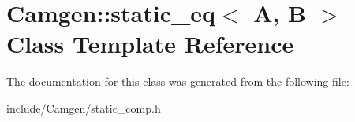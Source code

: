 \hypertarget{a00506}{\section{Camgen\-:\-:static\-\_\-eq$<$ A, B $>$ Class Template Reference}
\label{a00506}
}


The documentation for this class was generated from the following file\-:\begin{DoxyCompactItemize}
\item 
include/\-Camgen/static\-\_\-comp.\-h\end{DoxyCompactItemize}
